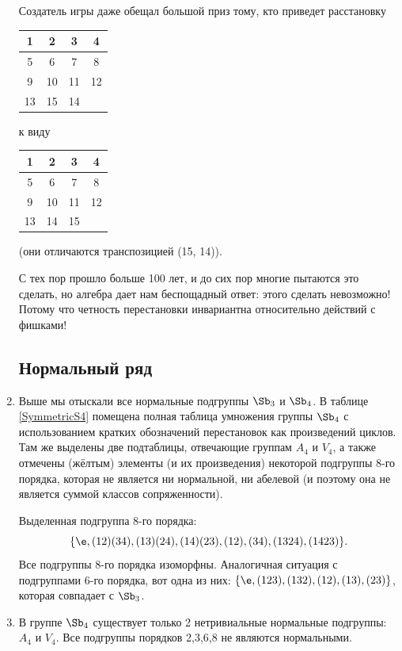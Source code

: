 \begin{enumerate}
Создатель игры даже обещал большой приз тому, кто приведет расстановку
\begin{center}
\begin{tabular}{|c|c|c|c|}
\hline
1 & 2 & 3 & 4 \\ \hline
5 & 6 & 7 & 8 \\ \hline
9 & 10 & 11 & 12 \\ \hline
13 &15 & 14 & \\ \hline
\end{tabular}
\quad к виду \quad
\begin{tabular}{|c|c|c|c|}
\hline
1 & 2 & 3 & 4 \\ \hline
5 & 6 & 7 & 8 \\ \hline
9 & 10 & 11 & 12 \\ \hline
13 &14 & 15 & \\ \hline
\end{tabular}
\end{center}
(они отличаются транспозицией (15, 14)).

С тех пор прошло больше 100 лет, и до сих пор многие пытаются это сделать, но алгебра дает нам беспощадный ответ: этого сделать невозможно! Потому что четность перестановки инвариантна относительно действий с фишками!

\subsection*{Нормальный ряд}

\item Выше мы отыскали все нормальные подгруппы $\Sb_3$ и $\Sb_4$. В таблице \ref{SymmetricS4}  помещена полная таблица умножения группы $\Sb_4$ с использованием кратких обозначений перестановок как произведений циклов. Там же выделены две подтаблицы, отвечающие группам $A_4$ и $V_4$, а также отмечены (жёлтым) элементы (и их произведения) некоторой подгруппы 8-го порядка, которая не является ни нормальной, ни абелевой (и поэтому она не является суммой классов сопряженности).

Выделенная подгруппа 8-го порядка:
$$\{\e, (12)(34), (13)(24), (14)(23), (12), (34), (1324), (1423)\}.
$$
Все подгруппы 8-го порядка изоморфны. Аналогичная ситуация с подгруппами 6-го порядка, вот одна из них:
$\{\e, (123), (132), (12), (13), (23) \}$, которая совпадает с $\Sb_3$.

\item В группе $\Sb_4$ существует только 2 нетривиальные нормальные подгруппы: $A_4$ и $V_4$. Все подгруппы порядков 2,3,6,8 не являются нормальными.


\end{enumerate}
